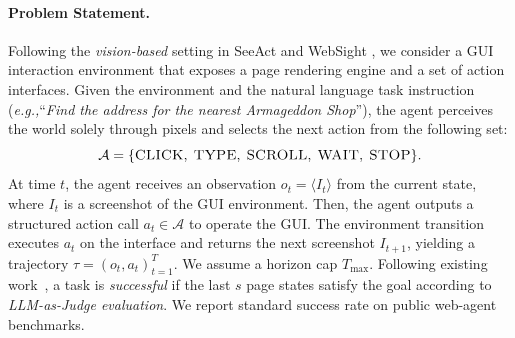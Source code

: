 \documentclass{article} %
\newcommand{\eg}{\emph{e.g.,}\xspace}
\begin{document}
\paragraph{Problem Statement.}
Following the \emph{vision-based} setting in SeeAct \citep{zheng2024seeact_multimodal_mind2web} and WebSight \citep{bhathal2025websight}, we consider a GUI interaction environment that exposes a page rendering engine and a set of action interfaces.
Given the environment and the natural language task instruction (\eg ``\textit{Find the address for the nearest Armageddon Shop}''), the agent perceives the world solely through pixels and selects the next action from the following set:
\begin{equation}
\mathcal{A}=\{\textsc{CLICK},\; \textsc{TYPE},\; \textsc{SCROLL},\; \textsc{WAIT},\; \textsc{STOP}\}.    
\end{equation}
At time $t$, the agent receives an observation
$o_t = \langle I_t \rangle$ from the current state, where $I_t$ is a screenshot of the GUI environment.%
Then, the agent outputs a structured action call $a_t \in \mathcal{A}$ to operate the GUI. 
The environment transition executes $a_t$ on the interface and returns the next screenshot $I_{t+1}$, yielding a trajectory $\tau=(o_t,a_t)_{t=1}^T$. We assume a horizon cap $T_{\max}$. Following existing work~\citep{he2024webvoyager}, a task is \emph{successful} if the last $s$ page states satisfy the goal according to \emph{LLM-as-Judge evaluation}. We report standard success rate on public web-agent benchmarks.
\end{document}
